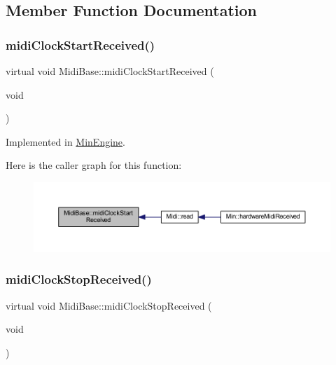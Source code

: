 \subsection{Member Function Documentation}
\mbox{\label{class_midi_base_aa368fed406eb62f900beb801e0552709}} 
\subsubsection{\texorpdfstring{midi\+Clock\+Start\+Received()}{midiClockStartReceived()}}
{\footnotesize\ttfamily virtual void Midi\+Base\+::midi\+Clock\+Start\+Received (\begin{DoxyParamCaption}\item[{void}]{ }\end{DoxyParamCaption})\hspace{0.3cm}{\ttfamily [pure virtual]}}



Implemented in \hyperlink{class_min_engine_ad0378027f052b780481611fa4335b68d}{Min\+Engine}.

Here is the caller graph for this function\+:
\nopagebreak
\begin{figure}[H]
\begin{center}
\leavevmode
\includegraphics[width=350pt]{de/def/class_midi_base_aa368fed406eb62f900beb801e0552709_icgraph}
\end{center}
\end{figure}
\mbox{\label{class_midi_base_ab9a5c65ebffdfc31e118fef9e4dd04bb}} 
\subsubsection{\texorpdfstring{midi\+Clock\+Stop\+Received()}{midiClockStopReceived()}}
{\footnotesize\ttfamily virtual void Midi\+Base\+::midi\+Clock\+Stop\+Received (\begin{DoxyParamCaption}\item[{void}]{ }\end{DoxyParamCaption})\hspace{0.3cm}{\ttfamily [pure virtual]}}



